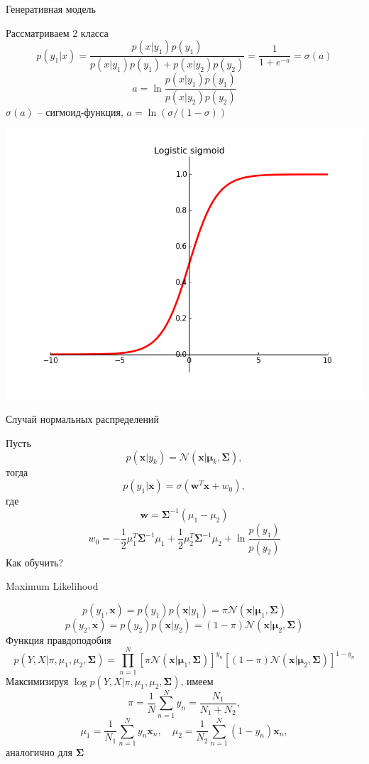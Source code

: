 \documentclass[10pt]{beamer}
\begin{document}
\begin{frame}{Генеративная модель}

Рассматриваем 2 класса
\[
p(y_1 | x) = \frac{p(x | y_1) p(y_1)}{p(x | y_1) p(y_1) + p(x | y_2) p(y_2)} = \frac{1}{1 + e^{-a}} = \sigma(a)
\]
\[
a = \ln \frac{p(x | y_1)p(y_1)}{p(x | y_2)p(y_2)}
\]
$\sigma(a)$ -- сигмоид-функция, $a = \ln (\sigma/(1-\sigma))$

\begin{center}
\includegraphics[scale=0.28]{images/sigmoid.png}
\end{center}

\end{frame}

\begin{frame}{Случай нормальных распределений}

Пусть 
\[
p(\mathbf{x} | y_k) = \mathcal{N}(\mathbf{x} | \mathbf{\mu}_k, \mathbf{\Sigma}),
\]
тогда
\[
p(y_1 | \mathbf{x}) = \sigma(\mathbf{w}^T \mathbf{x} + w_0),
\]
где
\[
\mathbf{w} = \mathbf{\Sigma}^{-1} (\mu_1 - \mu_2)
\]
\[
w_0 = - \frac 1 2 \mu_1^T \mathbf{\Sigma}^{-1} \mu_1 + \frac 1 2 \mu_2^T \mathbf{\Sigma}^{-1} \mu_2 + \ln \frac{p(y_1)}{p(y_2)}
\]
Как обучить?

\end{frame}

\begin{frame}{Maximum Likelihood}

\[
p(y_1, \mathbf{x}) = p(y_1) p(\mathbf{x} | y_1) = \pi \mathcal{N}(\mathbf{x} | \mathbf{\mu}_1, \mathbf{\Sigma})
\]
\[
p(y_2, \mathbf{x}) = p(y_2) p(\mathbf{x} | y_2) = (1 - \pi) \mathcal{N}(\mathbf{x} | \mathbf{\mu}_2, \mathbf{\Sigma})
\]
Функция правдоподобия
\[
p(Y, X | \pi, \mu_1, \mu_2, \mathbf{\Sigma}) = \prod_{n=1}^N \left[ \pi \mathcal{N}(\mathbf{x} | \mathbf{\mu}_1, \mathbf{\Sigma}) \right]^{y_n} \left[ (1 - \pi) \mathcal{N}(\mathbf{x} | \mathbf{\mu}_2, \mathbf{\Sigma}) \right]^{1 - y_n} 
\]
Максимизируя $\log p(Y, X | \pi, \mu_1, \mu_2, \mathbf{\Sigma})$, имеем
\[
\pi = \frac 1 N \sum_{n=1}^N y_n = \frac{N_1}{N_1 + N_2},
\]
\[
\mu_1 = \frac{1}{N_1} \sum_{n=1}^N y_n \mathbf{x}_n, \quad
\mu_2 = \frac{1}{N_2} \sum_{n=1}^N (1 - y_n) \mathbf{x}_n,
\]
аналогично для $\mathbf{\Sigma}$

\end{frame}
\end{document}
